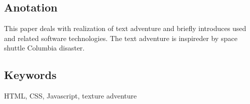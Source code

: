 \documentclass[main.tex]{subfiles}
\begin{document}
\subsection*{Anotation}
This paper deals with realization of text adventure and briefly introduces used and related software technologies. The text adventure is inspireder by space shuttle Columbia disaster. 

\subsection*{Keywords}
HTML, CSS, Javascript, texture adventure 
\end{document}

